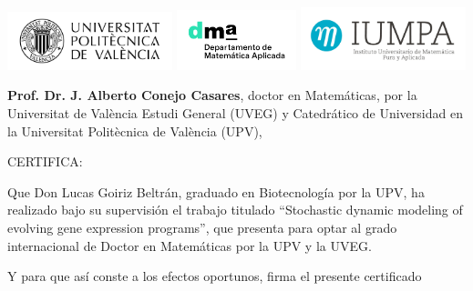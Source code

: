 \documentclass[11pt]{book}
\theoremstyle{definition}
\begin{document}
\vfill

\clearpage
\thispagestyle{empty}
\null
\clearpage

\chapter*{}
\vspace{-4cm}

\begin{flushright}
\includegraphics[width=0.36\textwidth]{assets/upv_logo.png}
\includegraphics[width=0.26\textwidth]{assets/dma_logo.jpg}
\includegraphics[width=0.36\textwidth]{assets/iumpa_logo.jpeg}
\end{flushright}

\vspace{0.5cm}

\noindent\textbf{Prof. Dr. J. Alberto Conejo Casares}, doctor en Matemáticas, por la Universitat de València Estudi General (UVEG) y Catedrático de Universidad en la Universitat Politècnica de València (UPV),

\vspace{1.5cm}

CERTIFICA:

\vspace{1.5cm}

\noindent Que Don Lucas Goiriz Beltrán, graduado en Biotecnología por la UPV, ha realizado bajo su supervisión el trabajo titulado
``Stochastic dynamic modeling of evolving gene expression programs'', que presenta para optar al grado internacional de Doctor en Matemáticas por la UPV y la UVEG.

\vspace{1cm}

Y para que así conste a los efectos oportunos, firma el presente certificado
\end{document}
